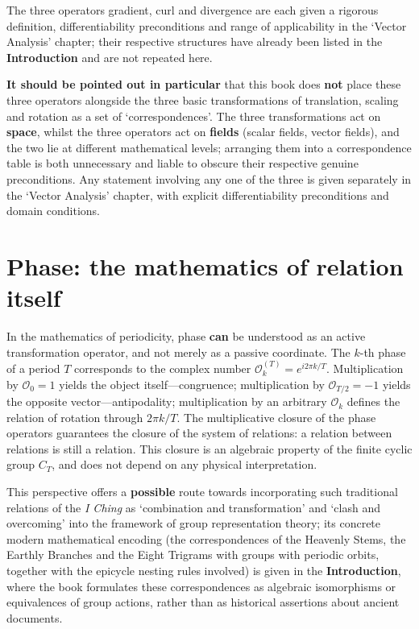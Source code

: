 The three operators gradient, curl and divergence are each given a rigorous definition, differentiability preconditions and range of applicability in the `Vector Analysis' chapter; their respective structures have already been listed in the \textbf{Introduction} and are not repeated here.

\textbf{It should be pointed out in particular} that this book does \textbf{not} place these three operators alongside the three basic transformations of translation, scaling and rotation as a set of `correspondences'. The three transformations act on \textbf{space}, whilst the three operators act on \textbf{fields} (scalar fields, vector fields), and the two lie at different mathematical levels; arranging them into a correspondence table is both unnecessary and liable to obscure their respective genuine preconditions. Any statement involving any one of the three is given separately in the `Vector Analysis' chapter, with explicit differentiability preconditions and domain conditions.

\section*{Phase: the mathematics of relation itself}

In the mathematics of periodicity, phase \textbf{can} be understood as an active transformation operator, and not merely as a passive coordinate. The $k$-th phase of a period $T$ corresponds to the complex number $\mathcal{O}_k^{(T)} = e^{i2\pi k/T}$. Multiplication by $\mathcal{O}_0 = 1$ yields the object itself---congruence; multiplication by $\mathcal{O}_{T/2} = -1$ yields the opposite vector---antipodality; multiplication by an arbitrary $\mathcal{O}_k$ defines the relation of rotation through $2\pi k/T$. The multiplicative closure of the phase operators guarantees the closure of the system of relations: a relation between relations is still a relation. This closure is an algebraic property of the finite cyclic group $C_T$, and does not depend on any physical interpretation.

This perspective offers a \textbf{possible} route towards incorporating such traditional relations of the \textit{I Ching} as `combination and transformation' and `clash and overcoming' into the framework of group representation theory; its concrete modern mathematical encoding (the correspondences of the Heavenly Stems, the Earthly Branches and the Eight Trigrams with groups with periodic orbits, together with the epicycle nesting rules involved) is given in the \textbf{Introduction}, where the book formulates these correspondences as algebraic isomorphisms or equivalences of group actions, rather than as historical assertions about ancient documents.

